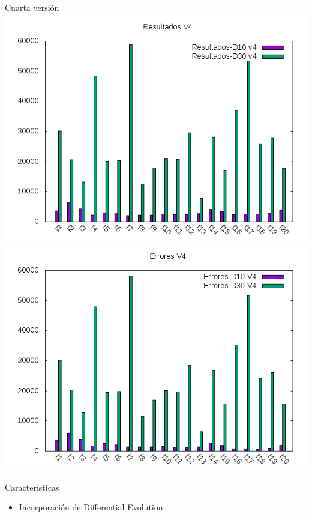 \documentclass[10pt]{beamer}
\begin{document}
	\begin{frame}[fragile]{Cuarta versión}
		\centering
		\includegraphics[scale=0.25]{./Imagenes/Resultados/resultados_v4.png}
		\includegraphics[scale=0.25]{./Imagenes/Errores/errores_v4.png}
		
		\begin{block}{Características}
			\begin{itemize}
				\item Incorporación de Differential Evolution.
			\end{itemize}
		\end{block}
	\end{frame}
\end{document}
